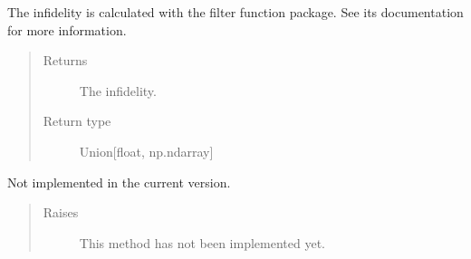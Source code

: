 \documentclass[letterpaper,10pt,english]{sphinxmanual}
\begin{document}
\begin{fulllineitems}
\begin{quote}
\begin{description}
\begin{itemize}
\end{itemize}

\end{description}\end{quote}

\begin{fulllineitems}
\label{\detokenize{qsim:qsim.cost_functions.OperatorFilterFunctionInfidelity.costs}}
The infidelity is calculated with the filter function package. See its
documentation for more information.
\begin{quote}\begin{description}
\item[{Returns}] \leavevmode
{} \textendash{} The infidelity.

\item[{Return type}] \leavevmode
Union{[}float, np.ndarray{]}

\end{description}\end{quote}

\end{fulllineitems}


\begin{fulllineitems}
\label{\detokenize{qsim:qsim.cost_functions.OperatorFilterFunctionInfidelity.grad}}
Not implemented in the current version.
\begin{quote}\begin{description}
\item[{Raises}] \leavevmode
{} \textendash{} This method has not been implemented yet.

\end{description}\end{quote}

\end{fulllineitems}


\end{fulllineitems}
\end{document}
